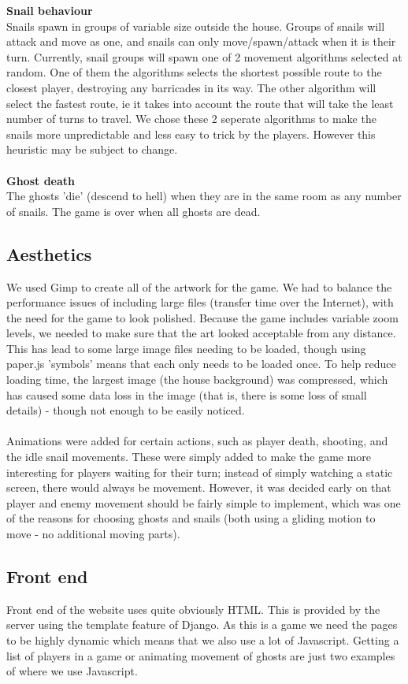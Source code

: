 \documentclass{article}
\begin{document}
\textbf{Snail behaviour} \\
Snails spawn in groups of variable size outside the house. Groups of snails will attack and move as one, and snails can only move/spawn/attack when it is their turn. Currently, snail groups will spawn one of 2 movement algorithms selected at random. One of them the algorithms selects the shortest possible route to the closest player, destroying any barricades in its way. The other algorithm will select the fastest route, ie it takes into account the route that will take the least number of turns to travel. We chose these 2 seperate algorithms to make the snails more unpredictable and less easy to trick by the players. However this heuristic may be subject to change. \\ \\
\textbf{Ghost death} \\
The ghosts 'die' (descend to hell) when they are in the same room as any number of snails. The game is over when all ghosts are dead.

\subsection{Aesthetics}
We used Gimp to create all of the artwork for the game. We had to balance the performance issues of including large files (transfer time over the Internet), with the need for the game to look polished. Because the game includes variable zoom levels, we needed to make sure that the art looked acceptable from any distance. This has lead to some large image files needing to be loaded, though using paper.js 'symbols' means that each only needs to be loaded once. To help reduce loading time, the largest image (the house background) was compressed, which has caused some data loss in the image (that is, there is some loss of small details) - though not enough to be easily noticed. \\ \\
Animations were added for certain actions, such as player death, shooting, and the idle snail movements. These were simply added to make the game more interesting for players waiting for their turn; instead of simply watching a static screen, there would always be movement. However, it was decided early on that player and enemy movement should be fairly simple to implement, which was one of the reasons for choosing ghosts and snails (both using a gliding motion to move - no additional moving parts).

\subsection{Front end}
Front end of the website uses quite obviously HTML. This is provided by the server using the template feature of Django. As this is a game we need the pages to be highly dynamic which means that we also use a lot of Javascript. Getting a list of players in a game or animating movement of ghosts are just two examples of where we use Javascript.
\end{document}
